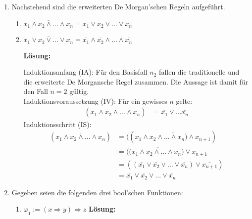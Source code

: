 \documentclass[paper=a4,fontsize=11pt]{scrartcl}%
\numberwithin{equation}{section}
\newenvironment{solution}
	{
		\color{Blue}
		\textbf{Lösung:}
	}{}
\begin{document}
\begin{enumerate}
\begin{enumerate}[resume]
\begin{solution}
		Gegenbeispiel: $x= 0,y= 0,z= 0$
		\begin{align*}
		(x \land z) \Leftrightarrow (y \land z) &= (0 \land 0) \Leftrightarrow (0 \land 0)\\
		&= 0 \Leftrightarrow 0\\
		&= 1\\
		(x \Leftrightarrow y) \land z &= (0 \not \Leftrightarrow 0) \land 0\\
		&= 0
		\end{align*}
		\end{solution}
	\end{enumerate}
	\item Nachstehend sind die erweiterten De Morgan'schen Regeln aufgeführt.
	\begin{enumerate}
		\item $\overline{x_1 \land x_2 \land \ldots \land x_n} = \overline{x_1} \lor \overline{x_2} \lor \ldots \lor \overline{x_n}$
		\item $\overline{x_1 \lor x_2 \lor \ldots \lor x_n} = \overline{x_1} \land \overline{x_2} \land \ldots \land \overline{x_n}$
		
		\begin{solution}
		
		Induktionsanfang (IA): Für den Basisfall $n_2$ fallen die traditionelle und die erweiterte De Morgansche Regel zusammen. Die Aussage ist damit für den Fall $n= 2$ gültig.\\
		Induktionsvoraussetzung (IV): Für ein gewisses $n$ gelte:
		\begin{align*}
		(\overline{x_1 \land x_2 \land \ldots \land x_n}) &= \overline{x_1} \lor \ldots \overline{x_n}
		\end{align*}
		Induktionsschritt (IS):
		\begin{align*}
		(\overline{x_1 \land x_2 \land \ldots \land x_n}) &=  ((\overline{x_1 \land x_2 \land \ldots \land x_n) \land x_{n+1}})\\
		&= ((\overline{x_1 \land x_2 \land \ldots \land x_n)} \lor \overline{x_{n+1}}\\
		&= ((\overline{x_1} \lor \overline{x_2} \lor \ldots \lor \overline{x_n}) \lor  \overline{x_{n+1}}) \\
		&= \overline{x_1} \lor \overline{x_2} \lor \ldots \lor \overline{x_n}
		\end{align*}
		\end{solution}
	\end{enumerate}
	\item Gegeben seien die folgenden drei bool'schen Funktionen:
	\begin{enumerate}
		\item $\varphi_1 := (x \Rightarrow y) \Rightarrow z$
		\begin{solution}
		

\end{solution}
\end{enumerate}
\end{enumerate}
\end{document}
